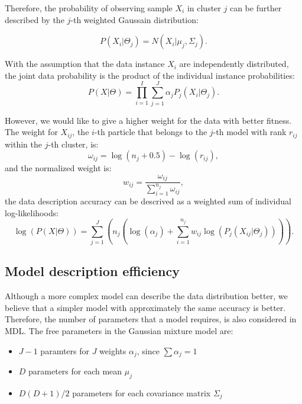 Therefore, the probability of observing sample $X_i$ in cluster $j$ can be further described by the $j$-th weighted Gaussain distribution:

\begin{equation}
P(X_i|\Theta_j) = N(X_i | \mu_j, \Sigma_j).
\end{equation}

With the assumption that the data instance $X_i$ are independently distributed, 
the joint data probability is the product of the individual instance probabilities:
\begin{equation}
P(X|\Theta) = \prod_{i=1}^{I} \sum_{j=1}^{J} \alpha_j P_j(X_i | \Theta_j).
\end{equation}

However, we would like to give a higher weight for the data with better fitness.
The weight for $X_{ij}$, the $i$-th particle that belongs to the $j$-th model with rank $r_{ij}$ within the $j$-th cluster, is:
\begin{equation}
\omega_{ij} = \log(n_j+0.5) - \log(r_{ij}),
\end{equation}
and the normalized weight is: 
\begin{equation}
w_{ij} = \frac{\omega_{ij}}{\sum_{i = 1}^{n_j}\omega_{ij}},
\end{equation}
the data description accuracy can be descrived as a weighted sum of individual log-likelihoods:
\begin{equation}
\log(P(X|\Theta)) = \sum_{j=1}^{J}( n_j(\log(\alpha_j) + \sum_{i=1}^{n_j} w_{ij} \log(P_j(X_{ij} | \Theta_j))) ).
\end{equation}


\subsection{Model description efficiency}
Although a more complex model can describe the data distribution better, 
we believe that a simpler model with approximately the same accuracy is better.
Therefore, the number of parameters that a model requires, is also considered in MDL.
The free parameters in the Gaussian mixture model are:
\begin{itemize}
\item $J-1$ paramters for $J$ weights $\alpha_j$, since $\sum \alpha_j = 1$
\item $D$ parameters for each mean $\mu_j$
\item $D(D+1)/2$ parameters for each covariance matrix $\Sigma_j$
\end{itemize}

